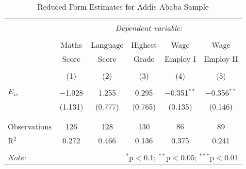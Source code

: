

\begin{table}[!htbp] \centering 
  \caption{Reduced Form Estimates for Addis Ababa Sample} 
  \label{} 
\begin{tabular}{@{\extracolsep{5pt}}lccccc} 
\\[-1.8ex]\hline 
\hline \\[-1.8ex] 
 & \multicolumn{5}{c}{\textit{Dependent variable:}} \\ 
\cline{2-6} 
\\[-1.8ex] & Maths & Language & Highest & Wage & Wage \\ 
 & Score & Score & Grade & Employ I & Employ II \\
\\[-1.8ex] & (1) & (2) & (3) & (4) & (5)\\ 
\hline \\[-1.8ex] 
 $E_{is}$ & $-$1.028 & 1.255 & 0.295 & $-$0.351$^{**}$ & $-$0.356$^{**}$ \\ 
  & (1.131) & (0.777) & (0.765) & (0.135) & (0.146) \\ 
  & & & & & \\ 
\hline \\[-1.8ex] 
Observations & 126 & 128 & 130 & 86 & 89 \\ 
R$^{2}$ & 0.272 & 0.466 & 0.136 & 0.375 & 0.241 \\ 
\hline 
\hline \\[-1.8ex] 
\textit{Note:}  & \multicolumn{5}{r}{$^{*}$p$<$0.1; $^{**}$p$<$0.05; $^{***}$p$<$0.01} \\ 
\end{tabular} 
\end{table} 



